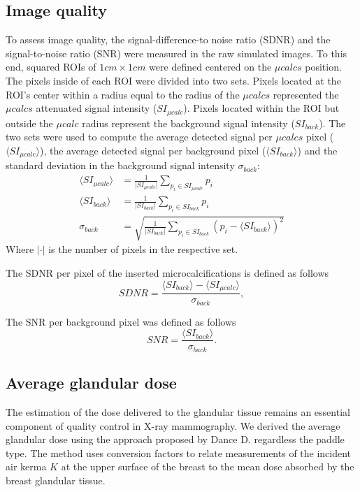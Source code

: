 \subsection{Image quality }\label{section:averagegalndulardose}
 To assess image quality, the signal-difference-to noise ratio (SDNR)  and the signal-to-noise ratio (SNR)  were measured in the raw simulated images. To this end, squared ROIs of  $1cm \times 1cm$ were defined centered on the $\mu calcs$ position. The pixels inside of each ROI were divided into two sets. Pixels located  at the ROI's center within a radius equal to the radius of the $\mu calcs$  represented the $\mu calcs$ attenuated signal intensity ($SI_{\mu calc}$). Pixels located within the ROI but outside the $\mu calc$ radius represent the background signal intensity ($SI_{back}$). The two sets were used to compute the average detected signal per $\mu calcs$ pixel ($\langle SI_{\mu calc}\rangle$), the average detected signal per background pixel  ($\langle SI_{back}\rangle$) and the standard deviation in the background signal intensity $\sigma_{back}$:
 \begin{align}
 \langle SI_{\mu calc}\rangle& = \frac{1}{\vert SI_{\mu calc}\vert} \sum_{p_i \in SI_{\mu calc}}p_i \\
  \langle SI_{back}\rangle &= \frac{1}{\vert SI_{back}\vert} \sum_{p_i \in SI_{back}}p_i\\
  \sigma_{back} &= \sqrt{\frac{1}{\vert SI_{back}\vert} \sum_{p_i \in SI_{back}} (p_i- \langle SI_{back}\rangle)^2}
  \end{align}
Where $\vert\cdot\vert$  is the number of pixels in the respective set.

  The SDNR per pixel of the inserted microcalcifications is defined as follows
 \begin{equation}
 SDNR = \frac{\langle SI_{back}\rangle - \langle SI_{\mu calc}\rangle}{\sigma_{back}},
\end{equation}

 
The SNR per background pixel was defined as follows  
 \begin{equation}
 SNR = \frac{\langle SI_{back}\rangle}{\sigma_{back}}.
\end{equation}



\subsection{Average glandular dose}
The estimation of the dose delivered to the glandular tissue remains an essential component of quality control in X-ray mammography. We derived the average glandular dose using the approach proposed by Dance D. \citep{dance_additional_2000} regardless the paddle type. The method uses conversion factors to relate measurements of the incident air kerma $K$ at the upper surface of the breast to the mean dose absorbed by the breast glandular tissue. 

